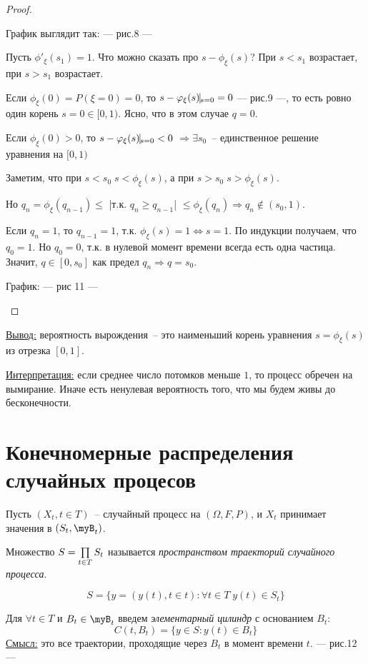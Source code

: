 \begin{proof}
\begin{enumerate}
График выглядит так:
--- рис.8 ---

Пусть $\phi'_\xi(s_1) = 1$. Что можно сказать про $s - \phi_\xi(s)$?
При $s < s_1$ возрастает, при $s > s_1$ возрастает.

Если $\phi_\xi(0) = P(\xi = 0) = 0$, то $s - \phi_\xi(s) \vline_{s=0} = 0$ --- рис.9 ---,
то есть ровно один корень $s = 0 \in [0, 1)$. Ясно, что в этом случае $\boxed{q = 0}$.

Если $\phi_\xi(0) > 0$, то $s - \phi_\xi(s) \vline_{s = 0} < 0$
$\Rightarrow \exists s_0$~-- единственное решение уравнения на $[0, 1)$

Заметим, что при $s < s_0 \; s < \phi_\xi(s)$, а при $s > s_0 \; s > \phi_\xi(s)$.

Но $q_n = \phi_\xi(q_{n-1}) \leq$ |т.к. $q_n \geq q_{n-1}$| $ \leq \phi_\xi(q_n)
\Rightarrow q_n \notin(s_0, 1)$.

Если $q_n = 1$, то $q_{n-1} = 1$, т.к. $\phi_\xi(s) = 1 \Leftrightarrow s = 1$.
По индукции получаем, что $q_0 = 1$. Но $q_0 = 0$, т.к. в нулевой момент времени
всегда есть одна частица.
Значит, $q \in [0, s_0]$ как предел $q_n \Rightarrow q = s_0$.

График: --- рис 11 --- 
\end{enumerate}
\end{proof}

\underline{Вывод:} вероятность вырождения~-- это наименьший корень уравнения $s = \phi_\xi(s)$
из отрезка $[0, 1]$.

\underline{Интерпретация:} если среднее число потомков меньше $1$, то процесс обречен на вымирание.
Иначе есть ненулевая вероятность того, что мы будем живы до бесконечности.

\section{Конечномерные распределения случайных процесов}
Пусть $(X_t, t \in T)$~-- случайный процесс на $(\Omega, F, P)$, и $X_t$  принимает
значения в $(S_t, \myB_t)$.

\begin{definition}
Множество $S = \prod\limits_{t\in T} S_t $ называется \emph{пространством траекторий случайного процесса}.
\end{definition}

$$S = \{y = (y(t), t \in t): \forall t \in T \; y(t) \in S_t\}$$

\begin{definition}
Для $\forall t \in T$ и $B_t \in \myB_t$ введем \emph{элементарный цилиндр}
с основанием $B_t$:
$$C(t, B_t) = \{y \in S: y(t) \in B_t\}$$
\underline{Смысл:} это все траектории, проходящие через $B_t$  в момент времени $t$.
--- рис.12 --- \forcenewline
\end{definition}

